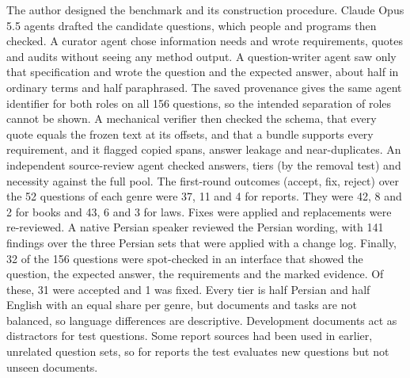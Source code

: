 The author designed the benchmark and its construction procedure.
Claude Opus 5.5 agents drafted the candidate questions, which people and programs then checked.
A curator agent chose information needs and wrote requirements, quotes and audits without seeing any method output.
A question-writer agent saw only that specification and wrote the question and the expected answer, about half in ordinary terms and half paraphrased.
The saved provenance gives the same agent identifier for both roles on all 156 questions, so the intended separation of roles cannot be shown.
A mechanical verifier then checked the schema, that every quote equals the frozen text at its offsets, and that a bundle supports every requirement, and it flagged copied spans, answer leakage and near-duplicates.
An independent source-review agent checked answers, tiers (by the removal test) and necessity against the full pool.
The first-round outcomes (accept, fix, reject) over the 52 questions of each genre were 37, 11 and 4 for reports. They were 42, 8 and 2 for books and 43, 6 and 3 for laws.
Fixes were applied and replacements were re-reviewed.
A native Persian speaker reviewed the Persian wording, with 141 findings over the three Persian sets that were applied with a change log.
Finally, 32 of the 156 questions were spot-checked in an interface that showed the question, the expected answer, the requirements and the marked evidence.
Of these, 31 were accepted and 1 was fixed.
Every tier is half Persian and half English with an equal share per genre, but documents and tasks are not balanced, so language differences are descriptive.
Development documents act as distractors for test questions.
Some report sources had been used in earlier, unrelated question sets, so for reports the test evaluates new questions but not unseen documents.


